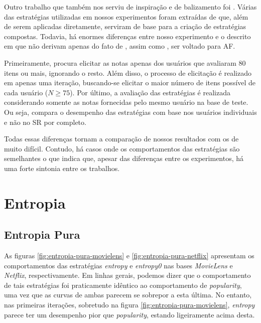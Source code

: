 Outro trabalho que também nos serviu de inspiração e de balizamento foi \citep{Rashid:2008:LPN:1540276.1540302}. Várias das estratégias utilizadas em nossos experimentos foram extraídas de \citep{Rashid:2008:LPN:1540276.1540302} que, além de serem aplicadas diretamente, serviram de base para a criação de estratégias compostas. Todavia, há enormes diferenças entre nosso experimento e o descrito em \citep{Rashid:2008:LPN:1540276.1540302} que não derivam apenas do fato de \citep{Rashid:2008:LPN:1540276.1540302}, assim como \citep{Elahi:2014:ALS:2542182.2542195}, ser voltado para AF.

Primeiramente, \citep{Rashid:2008:LPN:1540276.1540302} procura elicitar as notas apenas dos usuários que avaliaram 80 itens ou mais, ignorando o resto. Além disso, o processo de elicitação é realizado em apenas uma iteração, buscando-se elicitar o maior número de itens possível de cada usuário ($N\geq75$). Por último, a avaliação das estratégias é realizada considerando somente as notas fornecidas pelo mesmo usuário na base de teste. Ou seja, \citep{Rashid:2008:LPN:1540276.1540302} compara o desempenho das estratégias com base nos usuários individuais e não no SR por completo.

Todas essas diferenças tornam a comparação de nossos resultados com os de \citep{Rashid:2008:LPN:1540276.1540302} muito difícil. Contudo, há casos onde os comportamentos das estratégias são semelhantes o que indica que, apesar das diferenças entre os experimentos, há uma forte sintonia entre os trabalhos.

\section{Entropia} 

\subsection{Entropia Pura}

As figuras \ref{fig:entropia-pura-movielens} e \ref{fig:entropia-pura-netflix} apresentam os comportamentos das estratégias \textit{entropy} e \textit{entropy0} nas bases \textit{MovieLens} e \textit{Netflix}, respectivamente. Em linhas gerais, podemos dizer que o comportamento de tais estratégias foi praticamente idêntico ao comportamento de \textit{popularity}, uma vez que as curvas de ambas parecem se sobrepor a esta última. No entanto, nas primeiras iterações, sobretudo na figura \ref{fig:entropia-pura-movielens}, \textit{entropy} parece ter um desempenho pior que \textit{popularity}, estando ligeiramente acima desta. 

